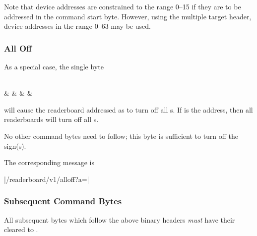Note that device addresses are constrained to the range 0--15 if they are to be addressed in
the command start byte. However, using the multiple target header, device addresses in the
range 0--63 may be used.


\subsubsection{All Off}
As a special case, the single byte
\begin{center}
	\begin{bytefield}[endianness=big]{8}
		 \\
		&
		&
		&
		&
	\end{bytefield}
\end{center}
will cause the readerboard addressed as  to turn off all \led s.
If  is the  address, then all readerboards will turn off
all \led s.

No other command bytes need to follow; this byte is sufficient to turn off
the sign(s).

The corresponding  message is
\begin{Coding}
	|/readerboard/v1/alloff?a=|
\end{Coding}

\subsubsection{Subsequent Command Bytes}
All subsequent bytes which follow the above binary headers \emph{must} have their
 cleared to . 

